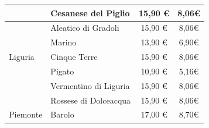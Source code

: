 \documentclass[12pt, a4paper]{article}
\begin{document}
\begin{longtable}{@{}|l|l|c|c|}
                         & Cesanese del Piglio                                                       & 15,90 €                                                         & 8,06€                                                                                                         \\ \hline
                         & Aleatico di Gradoli                                                       & 15,90 €                                                         & 8,06€                                                                                                         \\ \hline
                         & Marino                                                                    & 13,90 €                                                         & 6,90€                                                                                                         \\ \hline
    Liguria              & Cinque Terre                                                              & 15,90 €                                                         & 8,06€                                                                                                         \\ \hline
                         & Pigato                                                                    & 10,90 €                                                          & 5,16€                                                                                                         \\ \hline
                         & Vermentino di Liguria                                                     & 15,90 €                                                         & 8,06€                                                                                                         \\ \hline
                         & Rossese di Dolceacqua                                                     & 15,90 €                                                         & 8,06€                                                                                                         \\ \hline
    Piemonte             & Barolo                                                                    & 17,00 €                                                         & 8,70€                                                                                                         \\ \hline

\end{longtable}
\end{document}
